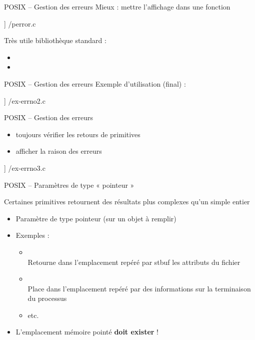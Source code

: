 \begin {frame} {POSIX -- Gestion des erreurs}
    Mieux : mettre l'affichage dans une fonction

    \fD\lstmonstyle] {\inc/perror.c}

    Très utile \implique bibliothèque standard :
    \begin {itemize}
	\item {}
	\item {}
    \end {itemize}
\end {frame}

\begin {frame} {POSIX -- Gestion des erreurs}
    Exemple d'utilisation (final) :

    \fD\lstmonstyle] {\inc/ex-errno2.c}
\end {frame}

\begin {frame} {POSIX -- Gestion des erreurs}
    \begin {block} {}
    \begin {itemize}
	\item \alert {toujours vérifier} les retours de primitives
	\item \alert {afficher} la raison des erreurs
    \end {itemize}
    \end {block}

    \fD\lstmonstyle] {\inc/ex-errno3.c}
\end {frame}

\begin {frame} {POSIX -- Paramètres de type « pointeur »}

    Certaines primitives retournent des résultats plus complexes
    qu'un simple entier

    \begin {itemize}
	\item Paramètre de type pointeur (sur un objet à remplir)
	\item Exemples :
	    \begin {itemize}
		\item {}
		    \\
		    Retourne dans l'emplacement repéré par \code
		    {\alert {stbuf}} les attributs du fichier
		\item {}
		    \\
		    Place dans l'emplacement repéré par  des informations sur la terminaison du
		    processus
		\item etc.
	    \end {itemize}

	\item L'emplacement mémoire pointé \textbf {doit exister} !
    \end {itemize}
\end {frame}

